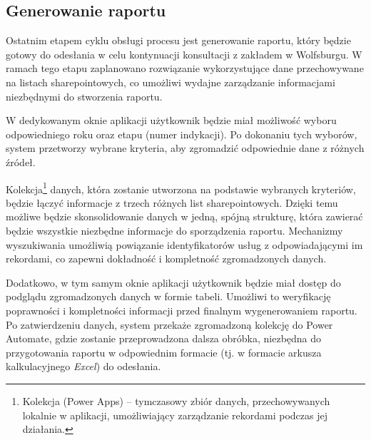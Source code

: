 \subsection{Generowanie raportu}

Ostatnim etapem cyklu obsługi procesu jest generowanie raportu, który będzie gotowy do odesłania w celu kontynuacji konsultacji z zakładem w Wolfsburgu. W ramach tego etapu zaplanowano rozwiązanie wykorzystujące dane przechowywane na listach sharepointowych, co umożliwi wydajne zarządzanie informacjami niezbędnymi do stworzenia raportu.

W dedykowanym oknie aplikacji użytkownik będzie miał możliwość wyboru odpowiedniego roku oraz etapu (numer indykacji). Po dokonaniu tych wyborów, system przetworzy wybrane kryteria, aby zgromadzić odpowiednie dane z różnych źródeł.

Kolekcja\footnote{Kolekcja (Power Apps) -- tymczasowy zbiór danych, przechowywanych lokalnie w aplikacji, umożliwiający zarządzanie rekordami podczas jej działania.} danych, która zostanie utworzona na podstawie wybranych kryteriów, będzie łączyć informacje z trzech różnych list sharepointowych. Dzięki temu możliwe będzie skonsolidowanie danych w jedną, spójną strukturę, która zawierać będzie wszystkie niezbędne informacje do sporządzenia raportu. Mechanizmy wyszukiwania umożliwią powiązanie identyfikatorów usług z odpowiadającymi im rekordami, co zapewni dokładność i kompletność zgromadzonych danych.

Dodatkowo, w tym samym oknie aplikacji użytkownik będzie miał dostęp do podglądu zgromadzonych danych w formie tabeli. Umożliwi to weryfikację poprawności i kompletności informacji przed finalnym wygenerowaniem raportu. Po zatwierdzeniu danych, system przekaże zgromadzoną kolekcję do Power Automate, gdzie zostanie przeprowadzona dalsza obróbka, niezbędna do przygotowania raportu w odpowiednim formacie (tj. w formacie arkusza kalkulacyjnego \textit{Excel}) do odesłania.
